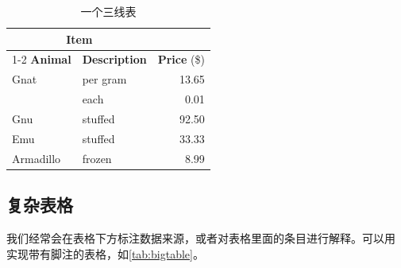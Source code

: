 \begin{table}[!hpt]
  \caption{一个三线表}
  \label{tab:firstone}
  \centering
  \begin{tabular}{@{}llr@{}} \toprule
    \multicolumn{2}{c}{\textbf{Item}}                            \\ \cmidrule(r){1-2}
    \textbf{Animal} & \textbf{Description} & \textbf{Price} (\$) \\ \midrule
    Gnat            & per gram             & 13.65               \\
                    & each                 & 0.01                \\
    Gnu             & stuffed              & 92.50               \\
    Emu             & stuffed              & 33.33               \\
    Armadillo       & frozen               & 8.99                \\ \bottomrule
  \end{tabular}
\end{table}

\subsection{复杂表格}

我们经常会在表格下方标注数据来源，或者对表格里面的条目进行解释。可以用
 实现带有脚注的表格，如\cref{tab:bigtable}。

